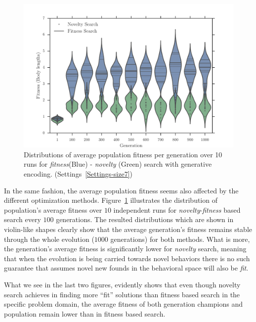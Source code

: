 \begin{figure}[t!]
\centering
\includegraphics[width=1.0\textwidth]{../Figures/Results/ViolinPlotsAvgGenFitSize7.pdf}
\caption{Distributions of average population fitness per generation over 10 runs for \emph{fitness}(Blue) - \emph{novelty} (Green) search with generative encoding. (Settings~\ref{Settings-size7})}
\label{fig:ViolinPlotsAvgGenFitSize7}
\end{figure}

In the same fashion, the average population fitness seems also affected by the different optimization methods. Figure~\ref{fig:ViolinPlotsAvgGenFitSize7} illustrates the distribution of population's average fitness over $10$ independent runs for \emph{novelty}-\emph{fitness} based search every $100$ generations. The resulted distributions which are shown in violin-like shapes clearly show that the average generation's fitness remains stable through the whole evolution ($1000$ generations) for both methods. What is more, the generation's average fitness is significantly lower for \emph{novelty} search, meaning that when the evolution is being carried towards novel behaviors there is no such guarantee that assumes novel new founds in the behavioral space will also be \emph{fit}. 

What we see in the last two figures, evidently shows that even though novelty search achieves in finding more ``fit'' solutions than fitness based search in the specific problem domain, the average fitness of both generation champions and population remain lower than in fitness based search.

